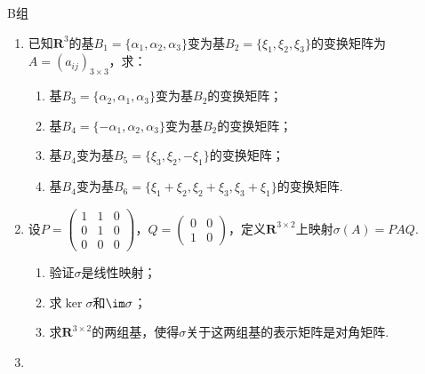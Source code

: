 \centerline{\heiti B组}
\begin{enumerate}
    \item 已知$\mathbf{R}^3$的基$B_1=\{\alpha_1,\alpha_2,\alpha_3\}$变为基$B_2=\{\xi_1,\xi_2,\xi_3\}$的变换矩阵为$A=(a_{ij})_{3 \times 3}$，求：
          \begin{enumerate}
              \item 基$B_3=\{\alpha_2,\alpha_1,\alpha_3\}$变为基$B_2$的变换矩阵；

              \item 基$B_4=\{-\alpha_1,\alpha_2,\alpha_3\}$变为基$B_2$的变换矩阵；

              \item 基$B_4$变为基$B_5=\{\xi_3,\xi_2,-\xi_1\}$的变换矩阵；

              \item 基$B_4$变为基$B_6=\{\xi_1+\xi_2,\xi_2+\xi_3,\xi_3+\xi_1\}$的变换矩阵.
          \end{enumerate}

    \item 设$P=\begin{pmatrix}
                  1 & 1 & 0 \\ 0 & 1 & 0 \\ 0 & 0 & 0
              \end{pmatrix}$，$Q=\begin{pmatrix}
                  0 & 0 \\ 1 & 0
              \end{pmatrix}$，定义$\mathbf{R}^{3\times 2}$上映射$\sigma(A)=PAQ$.
          \begin{enumerate}
              \item 验证$\sigma$是线性映射；

              \item 求$\ker\sigma$和$\im \sigma$；

              \item 求$\mathbf{R}^{3\times 2}$的两组基，使得$\sigma$关于这两组基的表示矩阵是对角矩阵.
          \end{enumerate}

    \item %
\end{enumerate}

